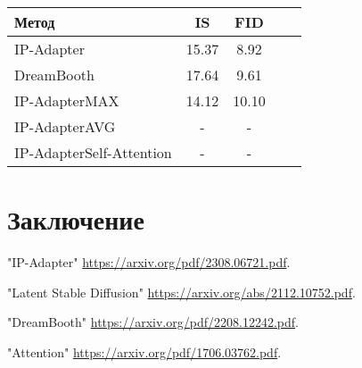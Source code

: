 \documentclass{article}
\begin{document}
\begin{table}[h]
\begin{tabular}{l c c c c}
\toprule
\textbf{Метод} & \textbf{IS} & \textbf{FID}\\
\midrule
IP-Adapter & 15.37  & 8.92\\
DreamBooth & 17.64 & 9.61\\
IP-AdapterMAX & 14.12 & 10.10\\
IP-AdapterAVG & - & -\\
IP-AdapterSelf-Attention & - & -\\
\bottomrule
\end{tabular}
\end{table}

\section{Заключение}

\begin{thebibliography}{1}
"IP-Adapter" 
\url{https://arxiv.org/pdf/2308.06721.pdf}.

"Latent Stable Diffusion" 
\url{https://arxiv.org/abs/2112.10752.pdf}.

"DreamBooth" 
\url{https://arxiv.org/pdf/2208.12242.pdf}.

"Attention" 
\url{https://arxiv.org/pdf/1706.03762.pdf}.

\end{thebibliography}
\end{document}
